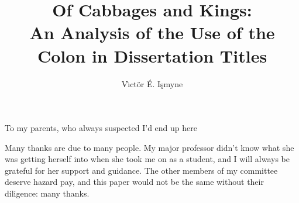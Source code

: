 \documentclass[11pt,expanded,copyright]{fsuthesis}
\title{Of Cabbages and Kings:\protect\\
  An Analysis of the Use of the Colon in Dissertation Titles}
\author{V\`\i ct\"or \'E. I\c smyne}  %
\begin{document}
\frontmatter          %
\maketitle            %
\makecommitteepage    %


\begin{dedication}
\centering
To my parents, who always suspected I'd end up here
\end{dedication}


\begin{acknowledgments}
Many thanks are due to many people. My major professor didn't
know what she was getting herself into when she took me on as
a student, and I will always be grateful for her support and
guidance. The other members of my committee deserve hazard pay,
and this paper would not be the same without their diligence:
many thanks.
\end{acknowledgments}


\tableofcontents
\listoftables
\listoffigures

\end{document}
